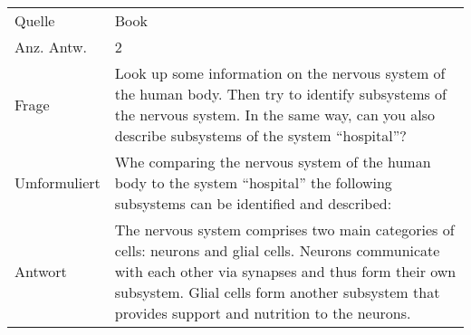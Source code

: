 \begin{landscape}
\begin{longtable}{p{3cm}p{}}
    Quelle & Book \\
    Anz. Antw. & 2 \\
    \midrule
    Frage & Look up some information on the nervous system of the human body.
    Then try to identify subsystems of the nervous system.
    In the same way, can you also describe subsystems of the system ``hospital''? \\
    Umformuliert & Whe comparing the nervous system of the human body to the system ``hospital'' the following subsystems can be identified and described: \\
    Antwort & The nervous system comprises two main categories of cells: neurons and glial cells.
    Neurons communicate with each other via synapses and thus form their own subsystem.
    Glial cells form another subsystem that provides support and nutrition to the neurons.


\end{longtable}
\end{landscape}
